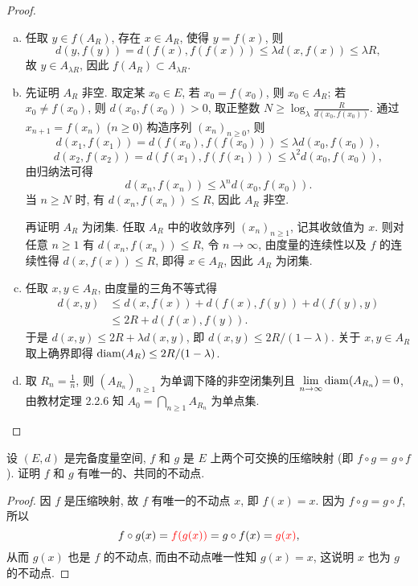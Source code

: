 \begin{proof}
  \begin{enumerate}[(a)]
    \item 任取 $y\in f(A_R)$, 存在 $x\in A_R$, 使得 $y=f(x)$, 则
    \[d(y,f(y))=d(f(x),f(f(x)))\leq\lambda d(x,f(x))\leq\lambda R,\]
    故 $y\in  A_{\lambda R}$, 因此 $f(A_R)\subset A_{\lambda R}$.

    \item 先证明 $A_R$ 非空. 取定某 $x_0\in E$, 若 $x_0=f(x_0)$, 则 $x_0\in A_R$;
    若 $x_0\neq f(x_0)$, 则 $d(x_0,f(x_0))>0$, 取正整数 $N\geq\log_{\lambda}\frac{R}{d(x_0,f(x_0))}$.
    通过 $x_{n+1}=f(x_n)$ ($n\geq 0$) 构造序列 $(x_n)_{n\geq 0}$, 则
    \[d(x_1,f(x_1))=d(f(x_0),f(f(x_0)))\leq\lambda d(x_0,f(x_0)),\]
    \[d(x_2,f(x_2))=d(f(x_1),f(f(x_1)))\leq\lambda^2 d(x_0,f(x_0)),\]
    由归纳法可得
    \[d(x_n,f(x_n))\leq\lambda^n d(x_0,f(x_0)).\]
    当 $n\geq N$ 时, 有 $d(x_n,f(x_n))\leq R$, 因此 $A_R$ 非空.

    再证明 $A_R$ 为闭集. 任取 $A_R$ 中的收敛序列 $(x_n)_{n\geq 1}$,
    记其收敛值为 $x$. 则对任意 $n\geq 1$ 有 $d(x_n,f(x_n))\leq R$,
    令 $n\to\infty$, 由度量的连续性以及 $f$ 的连续性得 $d(x,f(x))\leq R$,
    即得 $x\in A_R$, 因此 $A_R$ 为闭集.

    \item 任取 $x,y\in A_R$, 由度量的三角不等式得
    \begin{align*}
        d(x,y)
        &\leq d(x,f(x))+d(f(x),f(y))+d(f(y),y) \\
        &\leq 2R+d(f(x),f(y)).
    \end{align*}
    于是 $d(x,y)\leq 2R+\lambda d(x,y)$, 即 $d(x,y)\leq 2R/(1-\lambda)$.
    关于 $x,y\in A_R$ 取上确界即得 $\operatorname{diam}(A_R)\leq 2R/(1-\lambda)$.

    \item 取 $R_n=\frac{1}{n}$, 则 $(A_{R_n})_{n\geq 1}$ 为单调下降的非空闭集列且
    $\lim\limits_{n\to\infty}\operatorname{diam}(A_{R_n})=0$, 由教材定理 2.2.6
    知 $A_0=\bigcap\limits_{n\geq 1}A_{R_n}$ 为单点集.
  \end{enumerate}
\end{proof}



\begin{exercise}
    设 $(E,d)$ 是完备度量空间, $f$ 和 $g$ 是 $E$ 上两个可交换的压缩映射 (即 $f\circ g=g\circ f$).
    证明 $f$ 和 $g$ 有唯一的、共同的不动点.
\end{exercise}

\begin{proof}
    因 $f$ 是压缩映射, 故 $f$ 有唯一的不动点 $x$, 即 $f(x)=x$.
    因为 $f\circ g=g\circ f$, 所以
    \[f\circ g(x)=\textcolor{red}{f(g(x))}=g\circ f(x)=\textcolor{red}{g(x)},\]
    从而 $g(x)$ 也是 $f$ 的不动点, 而由不动点唯一性知 $g(x)=x$,
    这说明 $x$ 也为 $g$ 的不动点.
\end{proof}


